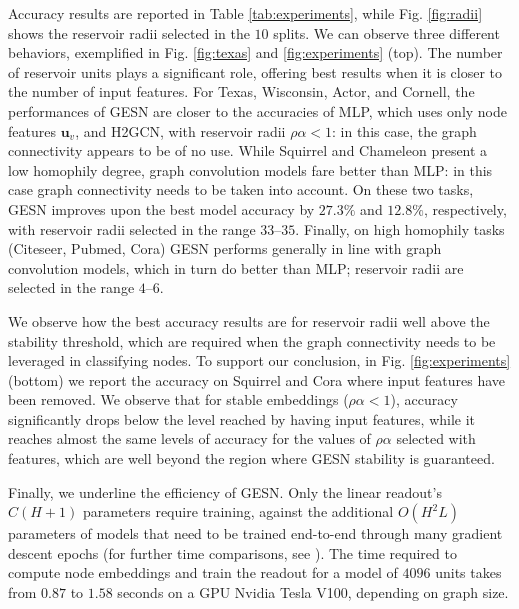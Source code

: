 \documentclass{esannV2p}
\begin{document}
Accuracy results are reported in Table \ref{tab:experiments}, while Fig. \ref{fig:radii} shows the reservoir radii selected in the $10$ splits.
We can observe three different behaviors, exemplified in Fig. \ref{fig:texas} and  \ref{fig:experiments} (top).
The number of reservoir units plays a significant role, offering best results when it is closer to the number of input features.
For Texas, Wisconsin, Actor, and Cornell, the performances of GESN are closer to the accuracies of MLP, which uses only node features $\mathbf{u}_v$, and H2GCN, with reservoir radii $\rho \alpha < 1$: in this case, the graph connectivity appears to be of no use.
While Squirrel and Chameleon present a low homophily degree, graph convolution models fare better than MLP: in this case graph connectivity needs to be taken into account.
On these two tasks, GESN improves upon the best model accuracy by $27.3\%$ and $12.8\%$, respectively, with reservoir radii selected in the range $33$--$35$.
Finally, on high homophily tasks (Citeseer, Pubmed, Cora) GESN performs generally in line with graph convolution models, which in turn do better than MLP; reservoir radii are selected in the range $4$--$6$.

We observe how the best accuracy results are for reservoir radii well above the stability threshold, which are required when the graph connectivity needs to be leveraged in classifying nodes.
To support our conclusion, in Fig. \ref{fig:experiments} (bottom) we report the accuracy on Squirrel and Cora where input features have been removed.
We observe that for stable embeddings ($\rho \alpha < 1$), accuracy significantly drops below the level reached by having input features, while it reaches almost the same levels of accuracy for the values of $\rho \alpha$ selected with features, which are well beyond the region where GESN stability is guaranteed.

Finally, we underline the efficiency of GESN.
Only the linear readout's $C (H+1)$ parameters require training, against the additional $O(H^2 L)$ parameters of models that need to be trained end-to-end through many gradient descent epochs (for further time comparisons, see \cite{Gallicchio2020}).
The time required to compute node embeddings and train the readout for a model of $4096$ units takes from $0.87$ to $1.58$ seconds on a GPU Nvidia Tesla V100, depending on graph size.
\end{document}
